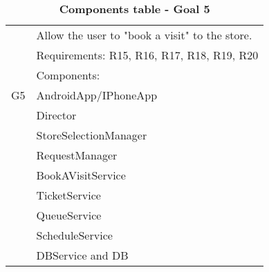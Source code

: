 \begin{table}
\begin{flushleft}
\begin{tabular}{|l|l|}
\hline
\cellcolor[HTML]{EC8D78}& \cellcolor[HTML]{F4D5CE}Allow the user to "book a visit" to the store.\\
\cline{2-2}
\cellcolor[HTML]{EC8D78}& \cellcolor[HTML]{F4D5CE}Requirements: R15, R16, R17, R18, R19, R20\\
\cline{2-2}
\cellcolor[HTML]{EC8D78}&Components:\\

\cellcolor[HTML]{EC8D78}G5&\quad\quad AndroidApp/IPhoneApp\\

\cellcolor[HTML]{EC8D78}&\quad\quad	Director \\

\cellcolor[HTML]{EC8D78}&\quad\quad	StoreSelectionManager \\

\cellcolor[HTML]{EC8D78}&\quad\quad	RequestManager \\

\cellcolor[HTML]{EC8D78}&\quad\quad\quad\quad	BookAVisitService \\

\cellcolor[HTML]{EC8D78}&\quad\quad\quad\quad	TicketService \\

\cellcolor[HTML]{EC8D78}&\quad\quad\quad\quad	QueueService\\ 

\cellcolor[HTML]{EC8D78}&\quad\quad\quad\quad	ScheduleService\\ 

\cellcolor[HTML]{EC8D78}&\quad\quad	DBService and DB \\
\hline
\end{tabular}
\end{flushleft}
\caption{\textbf{Components table - Goal 5}}
\label{tab:comp1}
\end{table}

